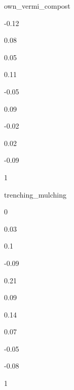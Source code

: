 \documentclass[
]{article}
\begin{document}
{ }

{ }

{ }

{ }

{ }

{ }

{ }

{ }

{ }

own\_vermi\_compost

{-0.12}

{0.08 }

{0.05 }

{0.11 }

{-0.05}

{0.09 }

{-0.02}

{0.02 }

{-0.09}

{1 }

{ }

{ }

{ }

{ }

{ }

{ }

{ }

{ }

{ }

{ }

{ }

{ }

{ }

{ }

trenching\_mulching

{0 }

{0.03 }

{0.1 }

{-0.09}

{0.21 }

{0.09 }

{0.14 }

{0.07 }

{-0.05}

{-0.08}

{1 }

{ }

{ }

{ }

{ }

{ }

{ }

{ }

{ }

{ }

{ }
\end{document}
